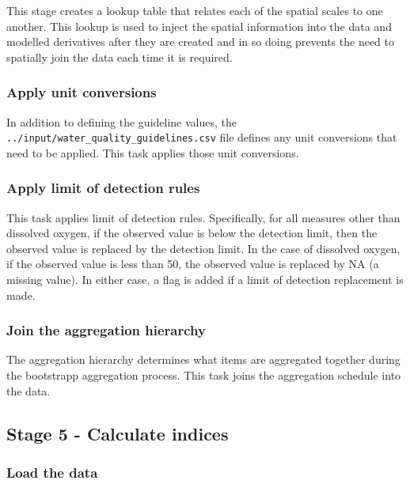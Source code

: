 \documentclass[
  8pt,
  a4paper]{article}
\begin{document}
This stage creates a lookup table that relates each of the spatial
scales to one another. This lookup is used to inject the spatial
information into the data and modelled derivatives after they are
created and in so doing prevents the need to spatially join the data
each time it is required.

\subsubsection{Apply unit conversions}\label{apply-unit-conversions}

In addition to defining the guideline values, the
\texttt{../input/water\_quality\_guidelines.csv} file defines any unit
conversions that need to be applied. This task applies those unit
conversions.

\subsubsection{Apply limit of detection
rules}\label{apply-limit-of-detection-rules}

This task applies limit of detection rules. Specifically, for all
measures other than dissolved oxygen, if the observed value is below the
detection limit, then the observed value is replaced by the detection
limit. In the case of dissolved oxygen, if the observed value is less
than 50, the observed value is replaced by NA (a missing value). In
either case, a flag is added if a limit of detection replacement is
made.

\subsubsection{Join the aggregation
hierarchy}\label{join-the-aggregation-hierarchy}

The aggregation hierarchy determines what items are aggregated together
during the bootstrapp aggregation process. This task joins the
aggregation schedule into the data.

\subsection{Stage 5 - Calculate
indices}\label{stage-5---calculate-indices}

\subsubsection{Load the data}\label{load-the-data}
\end{document}
